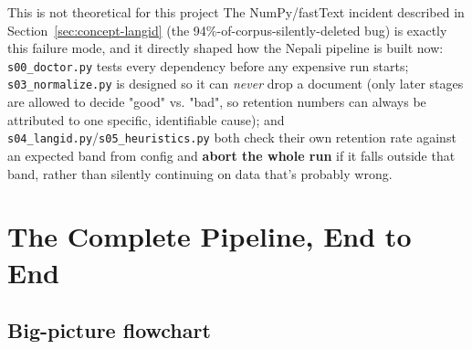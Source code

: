 \documentclass[11pt]{report}
\begin{document}
\begin{implementation}{This is not theoretical for this project}
The NumPy/fastText incident described in Section~\ref{sec:concept-langid}
(the 94\%-of-corpus-silently-deleted bug) is exactly this failure mode,
and it directly shaped how the Nepali pipeline is built now:
\texttt{s00\_doctor.py} tests every dependency before any expensive run
starts; \texttt{s03\_normalize.py} is designed so it can \textit{never}
drop a document (only later stages are allowed to decide "good" vs.
"bad", so retention numbers can always be attributed to one specific,
identifiable cause); and \texttt{s04\_langid.py}/\texttt{s05\_heuristics.py}
both check their own retention rate against an expected band from config
and \textbf{abort the whole run} if it falls outside that band, rather
than silently continuing on data that's probably wrong.
\end{implementation}

\chapter{The Complete Pipeline, End to End}

\section{Big-picture flowchart}
\end{document}
